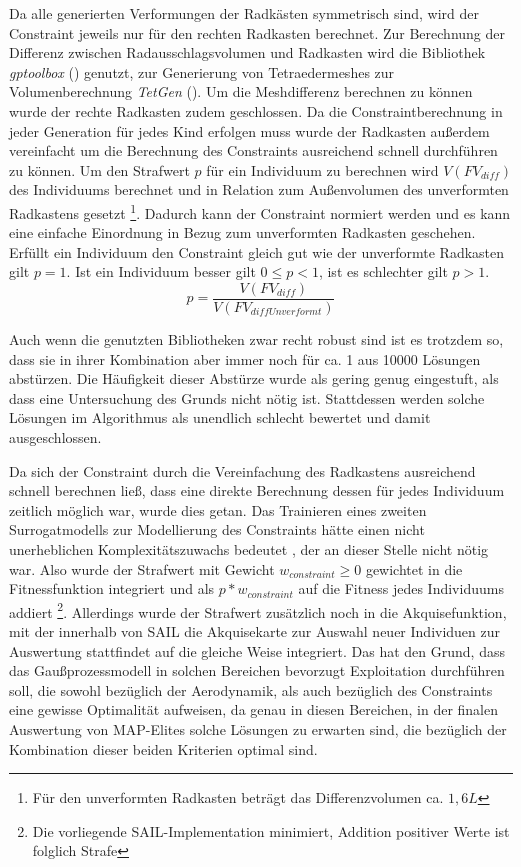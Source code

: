 Da alle generierten Verformungen der Radkästen symmetrisch sind, wird der Constraint jeweils nur für den rechten Radkasten berechnet.
Zur Berechnung der Differenz zwischen Radausschlagsvolumen und Radkasten wird die Bibliothek \textit{gptoolbox} (\cite{gptoolbox.b}) genutzt, zur Generierung von Tetraedermeshes zur Volumenberechnung \textit{TetGen} (\cite{Si.2015}).
Um die Meshdifferenz berechnen zu können wurde der rechte Radkasten zudem geschlossen.
Da die Constraintberechnung in jeder Generation für jedes Kind erfolgen muss wurde der Radkasten außerdem vereinfacht um die Berechnung  des Constraints ausreichend schnell durchführen zu können.
Um den Strafwert $p$ für ein Individuum zu berechnen wird $V(FV_{diff})$ des Individuums berechnet und in Relation zum Außenvolumen des unverformten Radkastens gesetzt \footnote{Für den unverformten Radkasten beträgt das Differenzvolumen ca. $1,6L$}.
Dadurch kann der Constraint normiert werden und es kann eine einfache Einordnung in Bezug zum unverformten Radkasten geschehen.
Erfüllt ein Individuum den Constraint gleich gut wie der unverformte Radkasten gilt $p=1$.
Ist ein Individuum besser gilt $0\leq p < 1$, ist es schlechter gilt $p>1$.
\[
	p = \frac{V(FV_{diff})}{V(FV_{diffUnverformt})}
\]

Auch wenn die genutzten Bibliotheken zwar recht robust sind ist es trotzdem so, dass sie in ihrer Kombination aber immer noch für ca. 1 aus 10000 Lösungen abstürzen.
Die Häufigkeit dieser Abstürze wurde als gering genug eingestuft, als dass eine Untersuchung des Grunds nicht nötig ist.
Stattdessen werden solche Lösungen im Algorithmus als unendlich schlecht bewertet und damit ausgeschlossen.

Da sich der Constraint durch die Vereinfachung des Radkastens ausreichend schnell berechnen ließ, dass eine direkte Berechnung dessen für jedes Individuum zeitlich möglich war, wurde dies getan.
Das Trainieren eines zweiten Surrogatmodells zur Modellierung des Constraints hätte einen nicht unerheblichen Komplexitätszuwachs bedeutet , der an dieser Stelle nicht nötig war.
Also wurde der Strafwert mit Gewicht $w_{constraint} \geq 0$ gewichtet in die Fitnessfunktion integriert und als $p*w_{constraint}$ auf die Fitness jedes Individuums addiert
\footnote{Die vorliegende SAIL-Implementation minimiert, Addition positiver Werte ist folglich Strafe}.
Allerdings wurde der Strafwert zusätzlich noch in die Akquisefunktion, mit der innerhalb von SAIL die Akquisekarte zur Auswahl neuer Individuen zur Auswertung stattfindet auf die gleiche Weise integriert. Das hat den Grund, dass das Gaußprozessmodell in solchen Bereichen bevorzugt Exploitation durchführen soll, die sowohl bezüglich der Aerodynamik, als auch bezüglich des Constraints eine gewisse Optimalität aufweisen, da genau in diesen Bereichen, in der finalen Auswertung von MAP-Elites solche Lösungen zu erwarten sind, die bezüglich der Kombination dieser beiden Kriterien optimal sind.


